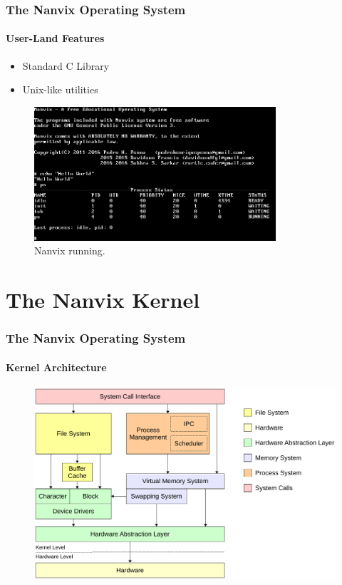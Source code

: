 \documentclass{beamer}
\begin{document}
		\begin{frame}
		\frametitle{The Nanvix Operating System}
		\framesubtitle{User-Land Features}
			\begin{itemize}
			\setlength\itemsep{0.5em}
				\item Standard C Library
				\item Unix-like utilities

				\end{itemize}
				\begin{figure}
					\centering
					\includegraphics[width=0.8\textwidth]{nanvix}
					\caption{Nanvix running.}
				\end{figure}
		\end{frame}

\section{The Nanvix Kernel}

		\begin{frame}
		\frametitle{The Nanvix Operating System}
		\framesubtitle{Kernel Architecture}
			\begin{figure}
				\centering
				\includegraphics[width=\linewidth]{nanvix-architecture}
			\end{figure}
		\end{frame}
\end{document}
